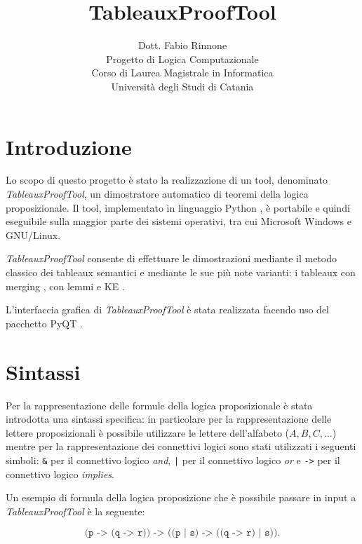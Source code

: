\documentclass[12pt,a4paper]{article}
\title{TableauxProofTool}
\author{	Dott. Fabio Rinnone\\
			Progetto di Logica Computazionale\\
			Corso di Laurea Magistrale in Informatica\\
			Università degli Studi di Catania}
\date{}
\theoremstyle{plain}
\theoremstyle{definition}
\theoremstyle{remark}
\begin{document}
\maketitle


%

\section*{Introduzione}
Lo scopo di questo progetto è stato la realizzazione di un tool, denominato
\emph{TableauxProofTool}, un dimostratore automatico di teoremi della logica proposizionale. Il tool, 
implementato in linguaggio Python \cite{van2007python}, è portabile e quindi eseguibile sulla maggior parte dei sistemi operativi,
tra cui Microsoft Windows e GNU/Linux.

\emph{TableauxProofTool} consente di effettuare le dimostrazioni mediante il metodo classico dei tableaux semantici \cite{fitting1996first}
e mediante le sue più note varianti: i tableaux con merging \cite{d1999tableau}, con lemmi \cite{d1999tableau} e KE \cite{d1994taming}.

L'interfaccia grafica di \emph{TableauxProofTool} è stata realizzata facendo uso del pacchetto PyQT \cite{harwani2011introduction}.

\section*{Sintassi}
Per la rappresentazione delle formule della logica proposizionale è stata introdotta una sintassi specifica: in particolare per la
rappresentazione delle lettere proposizionali è possibile utilizzare le lettere dell'alfabeto ($A, B, C,\ldots$) mentre per la 
rappresentazione dei connettivi logici sono stati utilizzati i seguenti simboli: \texttt{\&} per il connettivo logico \textit{and}, 
\texttt{|} per
il connettivo logico \textit{or} e \texttt{->} per il connettivo logico \textit{implies}.

Un esempio di formula della logica proposizione che è possibile passare in input a \textit{TableauxProofTool} è la seguente:

\begin{displaymath}
\texttt{(p -> (q -> r)) -> ((p | s) -> ((q -> r) | s))}.
\end{displaymath}
\end{document}
